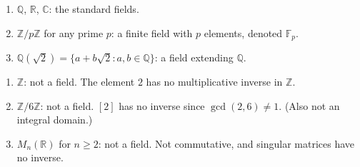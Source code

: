 \begin{example}[Fields]
\begin{enumerate}[label=(\roman*)]
  \item $\mathbb{Q}$, $\mathbb{R}$, $\mathbb{C}$: the standard fields.
  \item $\mathbb{Z}/p\mathbb{Z}$ for any prime $p$: a finite field
        with $p$ elements, denoted $\mathbb{F}_p$.
  \item $\mathbb{Q}(\sqrt{2}) = \{a + b\sqrt{2} : a, b \in \mathbb{Q}\}$:
        a field extending $\mathbb{Q}$.
\end{enumerate}
\end{example}

\begin{example}
\begin{enumerate}[label=(\roman*)]
  \item $\mathbb{Z}$: not a field. The element $2$ has no multiplicative
        inverse in $\mathbb{Z}$.
  \item $\mathbb{Z}/6\mathbb{Z}$: not a field. $[2]$ has no inverse
        since $\gcd(2,6) \neq 1$. (Also not an integral domain.)
  \item $M_n(\mathbb{R})$ for $n \geq 2$: not a field.
        Not commutative, and singular matrices have no inverse.
\end{enumerate}
\end{example}
